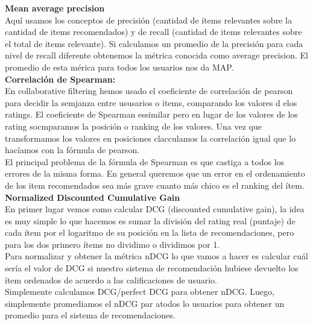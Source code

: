 \documentclass[titlepage,a4paper]{article}
\begin{document}
\textbf{Mean average precision}\\

Aquí usamos los conceptos de precisión (cantidad de ítems relevantes sobre la cantidad de items recomendados) y de recall (cantidad de items relevantes sobre el total de items relevante). Si calculamos un promedio de la precisión para cada nivel de recall diferente obtenemos la métrica conocida como average precision. El promedio de esta mérica para todos los usuarios nos da MAP. \\

\textbf{Correlación de Spearman:} \\


En collaborative filtering hemos usado el coeficiente de correlación de pearson para decidir la semjanza entre ususarios o items, comparando los valores d elos ratings. El coeficiente de Spearman essimilar pero en lugar de los valores de los rating socmparamos la posición o ranking de los valores. Una vez que transformamos los valores en posiciones clacculamos la correlación igual que lo hacíamos con la fórmula de pearson. \\

El principal problema de la fórmula de Spearman es que castiga a todos los errores de la misma forma. En general queremos que un error en el ordenamiento de los item recomendados sea más grave cuanto más chico es el ranking del ítem. \\


\textbf{Normalized Discounted Cumulative Gain}\\

En primer lugar vemos como calcular DCG (discounted cumulative gain), la idea es muy simple lo que hacemos es sumar la división del rating real (puntaje) de cada ítem por el logaritmo de su posición en la lista de recomendaciones, pero para los dos primero ítems no dividimo o dividimos por 1. \\

Para normalizar y obtener la métrica nDCG lo que vamos a hacer es calcular cuál sería el valor de DCG si nuestro sistema de recomendación hubiese devuelto los ítem ordenados de acuerdo a las calificaciones de usuario.  \\

Simplemente calculamos DCG/perfect DCG para obtener nDCG. Luego, simplemente promediamos el nDCG par atodos lo usuarios para obtener un promedio para el sistema de recomendaciones. \\
\end{document}
